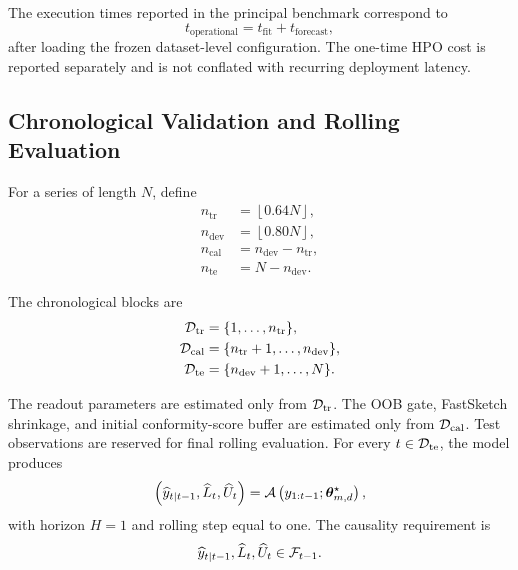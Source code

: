\documentclass[review,number,sort&compress]{elsarticle}
\begin{document}

The execution times reported in the principal benchmark correspond to
\begin{equation}
    t_{\mathrm{operational}}
    =
    t_{\mathrm{fit}}
    +
    t_{\mathrm{forecast}},
\end{equation}
after loading the frozen dataset-level configuration. The one-time HPO cost is
reported separately and is not conflated with recurring deployment latency.

\subsection{Chronological Validation and Rolling Evaluation}
\label{subsec:temporal_protocol}

For a series of length $N$, define
\begin{align}
    n_{\mathrm{tr}}
    &=
    \left\lfloor0.64N\right\rfloor,
    \\
    n_{\mathrm{dev}}
    &=
    \left\lfloor0.80N\right\rfloor,
    \\
    n_{\mathrm{cal}}
    &=
    n_{\mathrm{dev}}-n_{\mathrm{tr}},
    \\
    n_{\mathrm{te}}
    &=
    N-n_{\mathrm{dev}}.
\end{align}

The chronological blocks are
\begin{align}
    \mathcal{D}_{\mathrm{tr}}
    &=
    \{1,\ldots,n_{\mathrm{tr}}\},
    \\
    \mathcal{D}_{\mathrm{cal}}
    &=
    \{n_{\mathrm{tr}}+1,\ldots,n_{\mathrm{dev}}\},
    \\
    \mathcal{D}_{\mathrm{te}}
    &=
    \{n_{\mathrm{dev}}+1,\ldots,N\}.
\end{align}

The readout parameters are estimated only from $\mathcal{D}_{\mathrm{tr}}$. The OOB gate,
FastSketch shrinkage, and initial conformity-score buffer are estimated only
from $\mathcal{D}_{\mathrm{cal}}$. Test observations are reserved for final rolling evaluation.
For every $t\in\mathcal{D}_{\mathrm{te}}$, the model produces
\begin{equation}
    \left(
    \widehat{y}_{t|t-1},
    \widehat{L}_t,
    \widehat{U}_t
    \right)
    =
    \mathcal{A}
    \left(
    y_{1:t-1};
    \bm{\theta}_{m,d}^{\star}
    \right),
    \label{eq:rolling_prediction}
\end{equation}
with horizon $H=1$ and rolling step equal to one.
The causality requirement is
\begin{equation}
    \widehat{y}_{t|t-1},
    \widehat{L}_t,
    \widehat{U}_t
    \in
    \mathcal{F}_{t-1}.
    \label{eq:measurability}
\end{equation}
\end{document}
